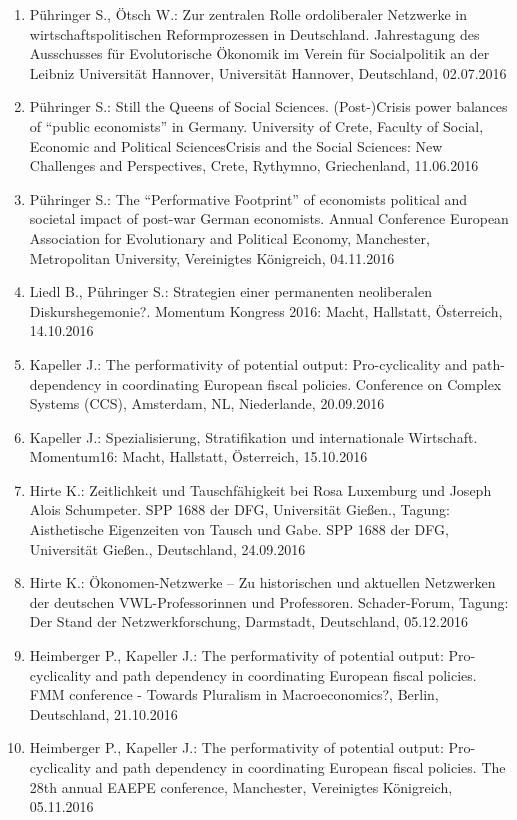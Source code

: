 \begin{enumerate}
	\item Pühringer S., Ötsch W.: Zur zentralen Rolle ordoliberaler Netzwerke in wirtschaftspolitischen Reformprozessen in Deutschland. Jahrestagung des Ausschusses für Evolutorische Ökonomik im Verein für Socialpolitik an der Leibniz Universität Hannover, Universität Hannover, Deutschland, 02.07.2016
	\item Pühringer S.: Still the Queens of Social Sciences. (Post-)Crisis power balances  of “public economists” in Germany. University of Crete, Faculty of Social, Economic and Political SciencesCrisis and the Social Sciences: New Challenges and Perspectives, Crete, Rythymno, Griechenland, 11.06.2016
	\item Pühringer S.: The “Performative Footprint” of economists political and societal impact of post-war German economists. Annual Conference \glqq European Association for Evolutionary and Political Economy\grqq{}, Manchester, Metropolitan University, Vereinigtes Königreich, 04.11.2016
	\item Liedl B., Pühringer S.: Strategien einer permanenten neoliberalen Diskurshegemonie?. Momentum Kongress 2016: Macht, Hallstatt, Österreich, 14.10.2016
	\item Kapeller J.: The performativity of potential output: Pro-cyclicality and path-dependency in coordinating European fiscal policies. Conference on Complex Systems (CCS), Amsterdam, NL, Niederlande, 20.09.2016
	\item Kapeller J.: Spezialisierung, Stratifikation und internationale Wirtschaft. Momentum16: Macht, Hallstatt, Österreich, 15.10.2016
	\item Hirte K.: Zeitlichkeit und Tauschfähigkeit bei Rosa Luxemburg und Joseph Alois Schumpeter. SPP 1688 der DFG, Universität Gießen., Tagung: Aisthetische Eigenzeiten von Tausch und Gabe. SPP 1688 der DFG, Universität Gießen., Deutschland, 24.09.2016
	\item Hirte K.: Ökonomen-Netzwerke – Zu historischen und aktuellen Netzwerken der deutschen VWL-Professorinnen und Professoren. Schader-Forum, Tagung: Der Stand der Netzwerkforschung, Darmstadt, Deutschland, 05.12.2016
	\item Heimberger P., Kapeller J.: The performativity of potential output: Pro-cyclicality and path dependency in coordinating European fiscal policies. FMM conference - Towards Pluralism in Macroeconomics?, Berlin, Deutschland, 21.10.2016
	\item Heimberger P., Kapeller J.: The performativity of potential output: Pro-cyclicality and path dependency in coordinating European fiscal policies. The 28th annual EAEPE conference, Manchester, Vereinigtes Königreich, 05.11.2016

\end{enumerate}
